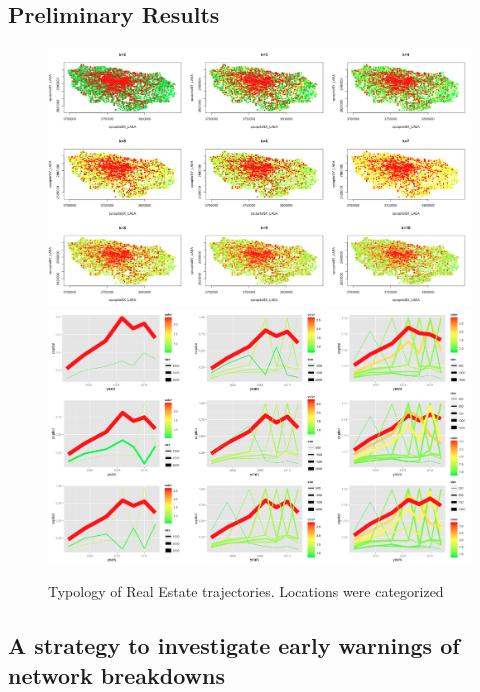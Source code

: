 \subsection{Preliminary Results}



\begin{figure}
\hspace{-3cm}\includegraphics[width=1.4\textwidth]{Figures/PartII/Empirical/RealEstate/normalized_k2-10}
\smallskip
\hspace{-3cm}\includegraphics[width=1.4\textwidth]{Figures/PartII/Empirical/RealEstate/trajectories_normalized_k=2-10}
\caption[Typology of Real Estate trajectories]{Typology of Real Estate trajectories. Locations were categorized }
\end{figure}



\subsection{A strategy to investigate early warnings of network breakdowns}








